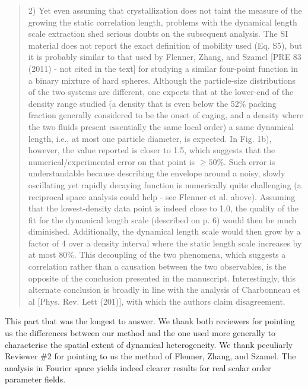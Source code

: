 \documentclass[10pt,a4paper]{letter}
\begin{document}
\begin{letter}{}
\begin{quotation}
\end{quotation}
\begin{quotation}
2) Yet even assuming that crystallization does not taint the measure of the growing the static correlation length, problems with the dynamical length scale extraction shed serious doubts on the subsequent analysis. The SI material does not report the exact definition of mobility used (Eq. S5), but it is probably similar to that used by Flenner, Zhang, and Szamel [PRE 83 (2011) - not cited in the text] for studying a similar four-point function in a binary mixture of hard spheres. Although the particle-size distributions of the two systems are different, one expects that at the lower-end of the density range studied (a density that is even below the 52\% packing fraction generally considered to be the onset of caging, and a density where the two fluids present essentially the same local order) a same dynamical length, i.e., at most one particle diameter, is expected. In Fig. 1b), however, the value reported is closer to 1.5, which suggests that the numerical/experimental error on
that point is $\geq 50\%$. Such error is understandable because describing the envelope around a noisy, slowly oscillating yet rapidly decaying function is numerically quite challenging (a reciprocal space analysis could help - see Flenner et al. above). Assuming that the lowest-density data point is indeed close to 1.0, the quality of the fit for the dynamical length scale (described on p. 6) would then be much diminished. Additionally, the dynamical length scale would then grow by a factor of 4 over a density interval where the static length scale increases by at most 80\%. This decoupling of the two phenomena, which suggests a correlation rather than a causation between the two observables, is the opposite of the conclusion presented in the manuscript. Interestingly, this alternate conclusion is broadly in line with the analysis of Charbonneau et al [Phys. Rev. Lett (201)], with which the authors claim disagreement.
\end{quotation}

This part that was the longest to answer. We thank both reviewers for pointing us the differences between our method and the one used more generally to characterise the spatial extent of dynamical heterogeneity. We thank peculiarly Reviewer \#2 for pointing to us the method of Flenner, Zhang, and Szamel. The analysis in Fourier space yields indeed clearer results for real scalar order parameter fields.


\end{letter}
\end{document}
